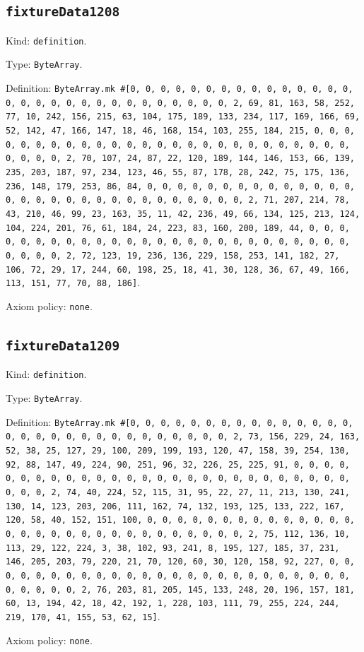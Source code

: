 \documentclass[11pt]{article}
\begin{document}
\subsection*{\texttt{fixtureData1208}}
\noindent Kind: \texttt{definition}.\par
\noindent Type: \texttt{ByteArray}.\par
\noindent Definition: \texttt{ByteArray.mk \#[0, 0, 0, 0, 0, 0, 0, 0, 0, 0, 0, 0, 0, 0, 0, 0, 0, 0, 0, 0, 0, 0, 0, 0, 0, 0, 0, 0, 0, 0, 2, 69, 81, 163, 58, 252, 77, 10, 242, 156, 215, 63, 104, 175, 189, 133, 234, 117, 169, 166, 69, 52, 142, 47, 166, 147, 18, 46, 168, 154, 103, 255, 184, 215, 0, 0, 0, 0, 0, 0, 0, 0, 0, 0, 0, 0, 0, 0, 0, 0, 0, 0, 0, 0, 0, 0, 0, 0, 0, 0, 0, 0, 0, 0, 2, 70, 107, 24, 87, 22, 120, 189, 144, 146, 153, 66, 139, 235, 203, 187, 97, 234, 123, 46, 55, 87, 178, 28, 242, 75, 175, 136, 236, 148, 179, 253, 86, 84, 0, 0, 0, 0, 0, 0, 0, 0, 0, 0, 0, 0, 0, 0, 0, 0, 0, 0, 0, 0, 0, 0, 0, 0, 0, 0, 0, 0, 0, 0, 2, 71, 207, 214, 78, 43, 210, 46, 99, 23, 163, 35, 11, 42, 236, 49, 66, 134, 125, 213, 124, 104, 224, 201, 76, 61, 184, 24, 223, 83, 160, 200, 189, 44, 0, 0, 0, 0, 0, 0, 0, 0, 0, 0, 0, 0, 0, 0, 0, 0, 0, 0, 0, 0, 0, 0, 0, 0, 0, 0, 0, 0, 0, 0, 2, 72, 123, 19, 236, 136, 229, 158, 253, 141, 182, 27, 106, 72, 29, 17, 244, 60, 198, 25, 18, 41, 30, 128, 36, 67, 49, 166, 113, 151, 77, 70, 88, 186]}.\par
\noindent Axiom policy: \texttt{none}.\par
\subsection*{\texttt{fixtureData1209}}
\noindent Kind: \texttt{definition}.\par
\noindent Type: \texttt{ByteArray}.\par
\noindent Definition: \texttt{ByteArray.mk \#[0, 0, 0, 0, 0, 0, 0, 0, 0, 0, 0, 0, 0, 0, 0, 0, 0, 0, 0, 0, 0, 0, 0, 0, 0, 0, 0, 0, 0, 0, 2, 73, 156, 229, 24, 163, 52, 38, 25, 127, 29, 100, 209, 199, 193, 120, 47, 158, 39, 254, 130, 92, 88, 147, 49, 224, 90, 251, 96, 32, 226, 25, 225, 91, 0, 0, 0, 0, 0, 0, 0, 0, 0, 0, 0, 0, 0, 0, 0, 0, 0, 0, 0, 0, 0, 0, 0, 0, 0, 0, 0, 0, 0, 0, 2, 74, 40, 224, 52, 115, 31, 95, 22, 27, 11, 213, 130, 241, 130, 14, 123, 203, 206, 111, 162, 74, 132, 193, 125, 133, 222, 167, 120, 58, 40, 152, 151, 100, 0, 0, 0, 0, 0, 0, 0, 0, 0, 0, 0, 0, 0, 0, 0, 0, 0, 0, 0, 0, 0, 0, 0, 0, 0, 0, 0, 0, 0, 0, 2, 75, 112, 136, 10, 113, 29, 122, 224, 3, 38, 102, 93, 241, 8, 195, 127, 185, 37, 231, 146, 205, 203, 79, 220, 21, 70, 120, 60, 30, 120, 158, 92, 227, 0, 0, 0, 0, 0, 0, 0, 0, 0, 0, 0, 0, 0, 0, 0, 0, 0, 0, 0, 0, 0, 0, 0, 0, 0, 0, 0, 0, 0, 0, 2, 76, 203, 81, 205, 145, 133, 248, 20, 196, 157, 181, 60, 13, 194, 42, 18, 42, 192, 1, 228, 103, 111, 79, 255, 224, 244, 219, 170, 41, 155, 53, 62, 15]}.\par
\noindent Axiom policy: \texttt{none}.\par
\end{document}
